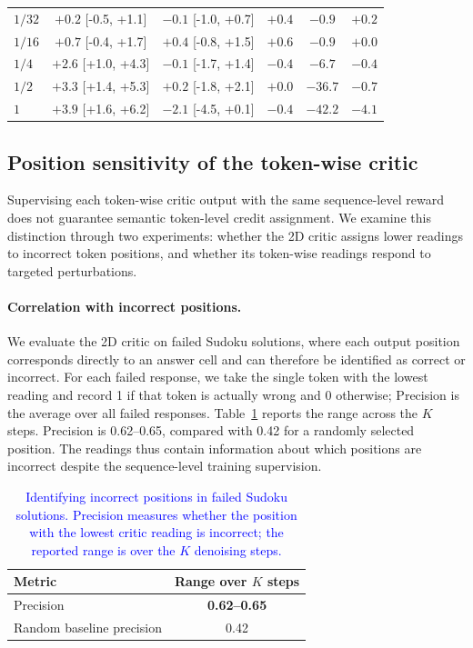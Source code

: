 \begin{table}[!t]
\begin{tabular}{@{}lccccc@{}}
$1/32$ & $+0.2$ {\scriptsize[-0.5, +1.1]} & $-0.1$ {\scriptsize[-1.0, +0.7]} & $+0.4$ & $-0.9$ & $+0.2$ \\
$1/16$ & $+0.7$ {\scriptsize[-0.4, +1.7]} & $+0.4$ {\scriptsize[-0.8, +1.5]} & $+0.6$ & $-0.9$ & $+0.0$ \\
$1/4$ & $+2.6$ {\scriptsize[+1.0, +4.3]} & $-0.1$ {\scriptsize[-1.7, +1.4]} & $-0.4$ & $-6.7$ & $-0.4$ \\
$1/2$ & $+3.3$ {\scriptsize[+1.4, +5.3]} & $+0.2$ {\scriptsize[-1.8, +2.1]} & $+0.0$ & $-36.7$ & $-0.7$ \\
$1$ & $+3.9$ {\scriptsize[+1.6, +6.2]} & $-2.1$ {\scriptsize[-4.5, +0.1]} & $-0.4$ & $-42.2$ & $-4.1$ \\
\bottomrule\end{tabular}\end{table}

\begingroup
\color{blue}
\subsection{Position sensitivity of the token-wise critic}
\label{app:position_sensitivity}
Supervising each token-wise critic output with the same sequence-level reward does not guarantee semantic token-level credit assignment. We examine this distinction through two experiments: whether the 2D critic assigns lower readings to incorrect token positions, and whether its token-wise readings respond to targeted perturbations.

\paragraph{Correlation with incorrect positions.}
We evaluate the 2D critic on failed Sudoku solutions, where each output position corresponds directly to an answer cell and can therefore be identified as correct or incorrect. For each failed response, we take the single token with the lowest reading and record 1 if that token is actually wrong and 0 otherwise; Precision is the average over all failed responses. Table~\ref{tab:critic_position_precision} reports the range across the $K$ steps. Precision is 0.62--0.65, compared with 0.42 for a randomly selected position. The readings thus contain information about which positions are incorrect despite the sequence-level training supervision.

\begin{table}[H]
\centering\small\color{blue}
\caption{\textcolor{blue}{Identifying incorrect positions in failed Sudoku solutions. Precision measures whether the position with the lowest critic reading is incorrect; the reported range is over the $K$ denoising steps.}}
\label{tab:critic_position_precision}
\begin{tabular}{@{}lc@{}}
\toprule
\textbf{Metric} & \textbf{Range over $K$ steps} \\
\midrule
Precision & \textbf{0.62--0.65} \\
Random baseline precision & 0.42 \\
\bottomrule
\end{tabular}
\end{table}

